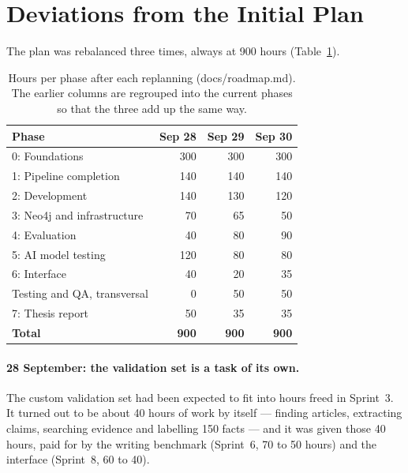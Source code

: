 
\section{Deviations from the Initial Plan}
\label{sec:deviations}

The plan was rebalanced three times, always at 900 hours
(Table~\ref{tab:rebalance}).

\begin{table}[H]
\centering
\small
\caption{Hours per phase after each replanning (docs/roadmap.md). The
earlier columns are regrouped into the current phases so that the
three add up the same way.}
\label{tab:rebalance}
\begin{tabular}{@{}lrrr@{}}
\toprule
Phase & Sep 28 & Sep 29 & Sep 30 \\
\midrule
0: Foundations                      & 300 & 300 & 300 \\
1: Pipeline completion              & 140 & 140 & 140 \\
2: Development                      & 140 & 130 & 120 \\
3: Neo4j and infrastructure         &  70 &  65 &  50 \\
4: Evaluation                       &  40 &  80 &  90 \\
5: AI model testing                 & 120 &  80 &  80 \\
6: Interface                        &  40 &  20 &  35 \\
Testing and QA, transversal         &   0 &  50 &  50 \\
7: Thesis report                    &  50 &  35 &  35 \\
\midrule
\textbf{Total}                      & \textbf{900} & \textbf{900} & \textbf{900} \\
\bottomrule
\end{tabular}
\end{table}

\paragraph{28 September: the validation set is a task of its own.} The
custom validation set had been expected to fit into hours freed in
Sprint~3. It turned out to be about 40 hours of work by itself ---
finding articles, extracting claims, searching evidence and labelling
150 facts --- and it was given those 40 hours, paid for by the writing
benchmark (Sprint~6, 70 to 50 hours) and the interface (Sprint~8, 60 to
40).

